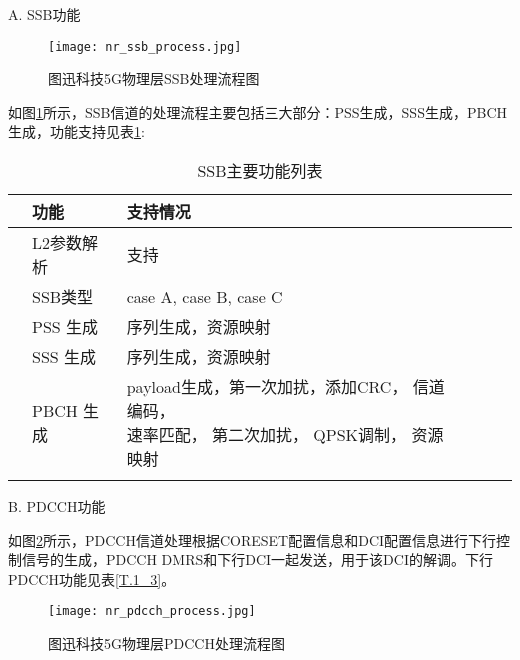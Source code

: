 A. SSB功能

\begin{figure}[h]
  \centering
  \texttt{[image: nr\_ssb\_process.jpg]}
  \caption{图迅科技5G物理层SSB处理流程图}
  \label{F.1_3}
\end{figure}

\par
{} %
\setlength{\hangindent}{2em}
如图\ref{F.1_3}所示，SSB信道的处理流程主要包括三大部分：PSS生成，SSS生成，PBCH生成，功能支持见表\ref{T.1_2}:

\begin{table}[h]
  \centering
  \caption{SSB主要功能列表}
  \label{T.1_2}
  \begin{tabular}{llllll}
      \hline
        & 功能   & 支持情况 \\
      \hline
        & L2参数解析 & 支持 \\
      \hline
        & SSB类型 & case A, case B, case C \\
      \hline
        & PSS 生成& 序列生成，资源映射 \\
      \hline
        & SSS 生成 & 序列生成，资源映射 \\
      \hline
        & PBCH 生成 & \makecell[l]{payload生成，第一次加扰，添加CRC， 信道编码， \\ 速率匹配， 第二次加扰， QPSK调制， 资源映射} \\
      \hline{}
  \end{tabular}
\end{table}


B. PDCCH功能

\par
{} %
\setlength{\hangindent}{2em}
如图\ref{F.1_4}所示，PDCCH信道处理根据CORESET配置信息和DCI配置信息进行下行控制信号的生成，PDCCH DMRS和下行DCI一起发送，用于该DCI的解调。下行PDCCH功能见表\ref{T.1_3}。\\

\begin{figure}[h]
  \centering
  \texttt{[image: nr\_pdcch\_process.jpg]}
  \caption{图迅科技5G物理层PDCCH处理流程图}
  \label{F.1_4}
\end{figure}

